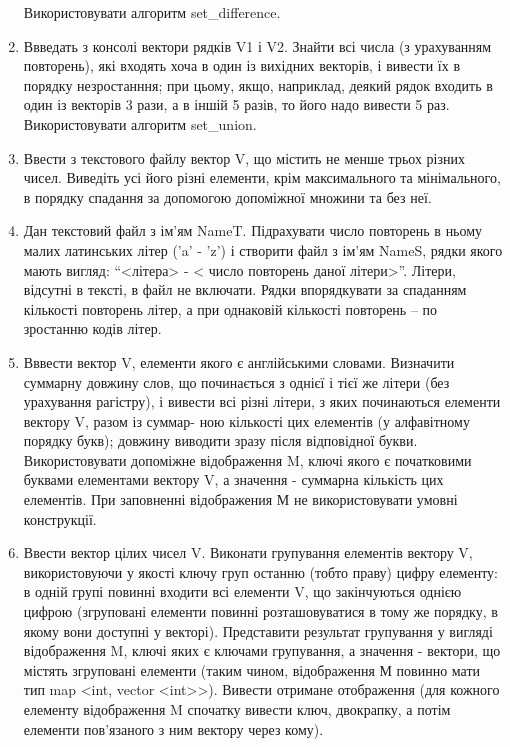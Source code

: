 \documentclass[]{article}
\begin{document}
\begin{enumerate}
  Використовувати алгоритм set\_difference.
\item
  Ввведать з консолі вектори рядків V1 і V2. Знайти всі числа (з
  урахуванням повторень), які входять хоча в один із вихідних векторів,
  і вивести їх в порядку незростанння; при цьому, якщо, наприклад,
  деякий рядок входить в один із векторів 3 рази, а в іншій 5 разів, то
  його надо вивести 5 раз. Використовувати алгоритм set\_union.
\item
  Ввести з текстового файлу вектор V, що містить не менше трьох різних
  чисел. Виведіть усі його різні елементи, крім максимального та
  мінімального, в порядку спадання за допомогою допоміжної множини та
  без неї.
\item
  Дан текстовий файл з ім'ям NameT. Підрахувати число повторень в ньому
  малих латинських літер ('a' - 'z') і створити файл з ім'ям NameS,
  рядки якого мають вигляд: ``\textless{}літера\textgreater{} -
  \textless{} число повторень даної літери\textgreater{}''. Літери,
  відсутні в тексті, в файл не включати. Рядки впорядкувати за спаданням
  кількості повторень літер, а при однаковій кількості повторень -- по
  зростанню кодів літер.
\item
  Вввести вектор V, елементи якого є англійськими словами. Визначити
  суммарну довжину слов, що починається з однієї і тієї же літери (без
  урахування рагістру), і вивести всі різні літери, з яких починаються
  елементи вектору V, разом із суммар- ною кількості цих елементів (у
  алфавітному порядку букв); довжину виводити зразу після відповідної
  букви. Використовувати допоміжне відображення M, ключі якого є
  початковими буквами елементами вектору V, а значення - суммарна
  кількість цих елементів. При заповненні відображения М не
  використовувати умовні конструкції.
\item
  Ввести вектор цілих чисел V. Виконати групування елементів вектору V,
  використовуючи у якості ключу груп останню (тобто праву) цифру
  елементу: в одній групі повинні входити всі елементи V, що
  закінчуються однією цифрою (згруповані елементи повинні
  розташовуватися в тому же порядку, в якому вони доступні у векторі).
  Представити результат групування у вигляді відображення M, ключі яких
  є ключами групування, а значення - вектори, що містять згруповані
  елементи (таким чином, відображення М повинно мати тип map
  \textless{}int, vector \textless{}int\textgreater{}\textgreater{}).
  Вивести отримане отображення (для кожного елементу відображення M
  спочатку вивести ключ, двокрапку, а потім елементи пов'язаного з ним
  вектору через кому).

\end{enumerate}
\end{document}
